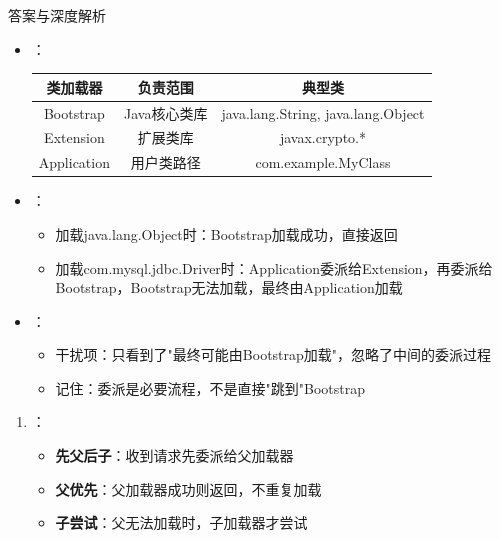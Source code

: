 \documentclass[12pt, a4paper]{ctexart}
\begin{document}
\begin{enumerate}[label=\textbf{\arabic*.}]
\begin{bluebox}{答案与深度解析}
\begin{itemize}[leftmargin=*, nosep]
			      \item {}：
			            \begin{tabular}{|c|c|c|}
				            \hline
				            \textbf{类加载器} & \textbf{负责范围} & \textbf{典型类}                       \\
				            \hline
				            Bootstrap     & Java核心类库      & java.lang.String, java.lang.Object \\
				            \hline
				            Extension     & 扩展类库          & javax.crypto.*                     \\
				            \hline
				            Application   & 用户类路径         & com.example.MyClass                \\
				            \hline
			            \end{tabular}

			      \item {}：
			            \begin{itemize}
				            \item 加载java.lang.Object时：Bootstrap加载成功，直接返回
				            \item 加载com.mysql.jdbc.Driver时：Application委派给Extension，再委派给Bootstrap，Bootstrap无法加载，最终由Application加载
			            \end{itemize}

			      \item {}：
			            \begin{itemize}
				            \item 干扰项：只看到了"最终可能由Bootstrap加载"，忽略了中间的委派过程
				            \item 记住：委派是必要流程，不是直接"跳到"Bootstrap
			            \end{itemize}
		      \end{itemize}

		      \begin{enumerate}[leftmargin=*, nosep]
			      \item {}：
			            \begin{itemize}
				            \item \textbf{先父后子}：收到请求先委派给父加载器
				            \item \textbf{父优先}：父加载器成功则返回，不重复加载
				            \item \textbf{子尝试}：父无法加载时，子加载器才尝试
			            \end{itemize}


\end{enumerate}
\end{bluebox}
\end{enumerate}
\end{document}
